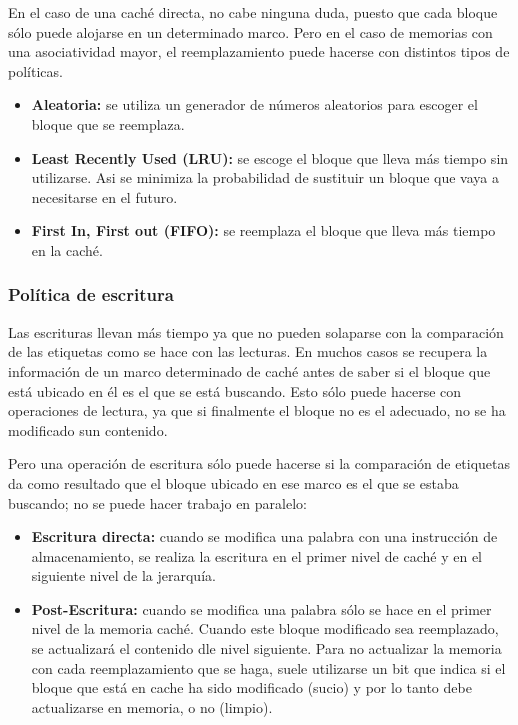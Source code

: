 En el caso de una caché directa, no cabe ninguna duda, puesto que cada bloque sólo puede alojarse en un determinado marco. Pero en el caso de memorias con una asociatividad mayor, el reemplazamiento puede hacerse con distintos tipos de políticas.

\begin{itemize}
  \item \textbf{Aleatoria:} se utiliza un generador de números aleatorios para escoger el bloque que se reemplaza.
  \item \textbf{Least Recently Used (LRU):} se escoge el bloque que lleva más tiempo sin utilizarse. Asi se minimiza la probabilidad de sustituir un bloque que vaya a necesitarse en el futuro.
  \item \textbf{First In, First out (FIFO):} se reemplaza el bloque que lleva más tiempo en la caché.
\end{itemize}

\subsubsection*{Política de escritura}

Las escrituras llevan más tiempo ya que no pueden solaparse con la comparación de las etiquetas como se hace con las lecturas. En muchos casos se recupera la información de un marco determinado de caché antes de saber si el bloque que está ubicado en él es el que se está buscando. Esto sólo puede hacerse con operaciones de lectura, ya que si finalmente el bloque no es el adecuado, no se ha modificado sun contenido.

Pero una operación de escritura sólo puede hacerse si la comparación de etiquetas da como resultado que el bloque ubicado en ese marco es el que se estaba buscando; no se puede hacer trabajo en paralelo:

\begin{itemize}
  \item \textbf{Escritura directa:} cuando se modifica una palabra con una instrucción de almacenamiento, se realiza la escritura en el primer nivel de caché y en el siguiente nivel de la jerarquía.
  \item \textbf{Post-Escritura:} cuando se modifica una palabra sólo se hace en el primer nivel de la memoria caché. Cuando este bloque modificado sea reemplazado, se actualizará el contenido dle nivel siguiente. Para no actualizar la memoria con cada reemplazamiento que se haga, suele utilizarse un bit que indica si el bloque que está en cache ha sido modificado (sucio) y por lo tanto debe actualizarse en memoria, o no (limpio).
\end{itemize}


